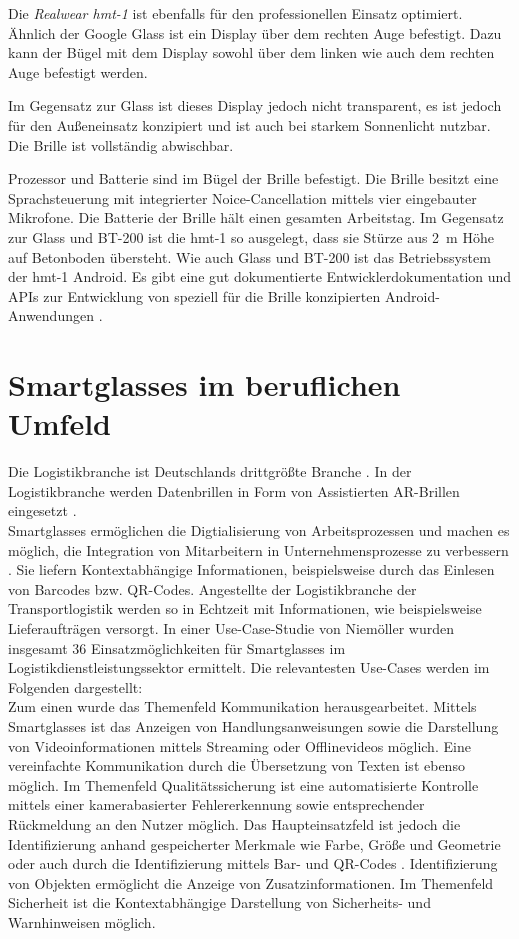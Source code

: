 Die \emph{Realwear hmt-1} ist ebenfalls für den professionellen Einsatz optimiert. Ähnlich der Google Glass ist ein Display über dem rechten Auge befestigt. Dazu kann der Bügel mit dem Display sowohl über dem linken wie auch dem rechten Auge befestigt werden.

Im Gegensatz zur Glass ist dieses Display jedoch nicht transparent, es ist jedoch für den Außeneinsatz konzipiert und ist auch bei starkem Sonnenlicht nutzbar. Die Brille ist vollständig abwischbar.
%
%

Prozessor und Batterie sind im Bügel der Brille befestigt. Die Brille  besitzt eine Sprachsteuerung mit integrierter Noice-Cancellation mittels vier eingebauter Mikrofone. Die Batterie der Brille hält einen gesamten Arbeitstag. Im Gegensatz zur Glass und BT-200 ist die hmt-1 so ausgelegt, dass sie Stürze aus 2~m Höhe auf Betonboden übersteht. Wie auch Glass und BT-200 ist das Betriebssystem der hmt-1 Android. Es gibt eine gut dokumentierte Entwicklerdokumentation und APIs zur Entwicklung von speziell für die Brille konzipierten Android-Anwendungen \cite{Realwear2018}.
%
%
%
%
%
%
\section{Smartglasses im beruflichen Umfeld}
\label{sec:Smartglasses_im beruflichen_Umfeld}
Die Logistikbranche ist Deutschlands drittgrößte Branche \cite{Zobel2016}. In der Logistikbranche werden Datenbrillen in Form von Assistierten AR-Brillen eingesetzt \cite{Niemoller2017}.
\\
Smartglasses ermöglichen die Digtialisierung von Arbeitsprozessen und machen es möglich, die Integration von Mitarbeitern in Unternehmensprozesse zu verbessern \cite{Zobel2016}. Sie liefern Kontextabhängige Informationen, beispielsweise durch das Einlesen von Barcodes bzw. QR-Codes. Angestellte der Logistikbranche der Transportlogistik werden so in Echtzeit mit Informationen, wie beispielsweise Lieferaufträgen versorgt. In einer Use-Case-Studie von Niemöller \cite{Niemoller2017} wurden insgesamt 36 Einsatzmöglichkeiten für Smartglasses im Logistikdienstleistungssektor ermittelt. Die relevantesten Use-Cases werden im Folgenden dargestellt:
\\
Zum einen wurde das Themenfeld Kommunikation herausgearbeitet. Mittels Smartglasses ist das Anzeigen von Handlungsanweisungen sowie die Darstellung von Videoinformationen mittels Streaming oder Offlinevideos möglich. Eine vereinfachte Kommunikation durch die Übersetzung von Texten ist ebenso möglich. Im Themenfeld Qualitätssicherung ist eine automatisierte Kontrolle mittels einer kamerabasierter Fehlererkennung sowie entsprechender Rückmeldung an den Nutzer möglich. Das Haupteinsatzfeld ist jedoch die Identifizierung anhand gespeicherter Merkmale wie Farbe, Größe und Geometrie oder auch durch die Identifizierung mittels Bar- und QR-Codes \cite{Niemoller2017}. Identifizierung von Objekten ermöglicht die Anzeige von Zusatzinformationen. Im Themenfeld Sicherheit ist die Kontextabhängige Darstellung von Sicherheits- und Warnhinweisen möglich. 


